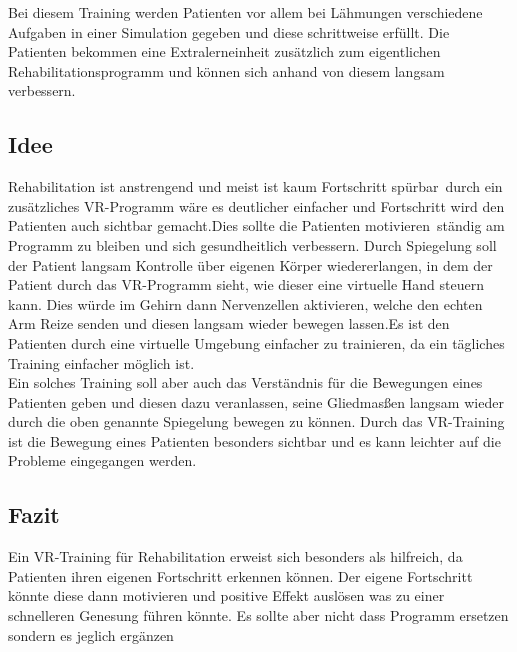 
Bei diesem Training werden Patienten vor allem bei Lähmungen verschiedene Aufgaben in einer Simulation gegeben und diese schrittweise erfüllt. Die Patienten bekommen eine Extralerneinheit zusätzlich zum eigentlichen Rehabilitationsprogramm und können sich anhand von diesem langsam verbessern.\\

\subsection{Idee}
Rehabilitation ist anstrengend und meist ist kaum Fortschritt spürbar durch ein zusätzliches VR-Programm wäre es deutlicher einfacher und Fortschritt wird den Patienten auch sichtbar gemacht.Dies sollte die Patienten motivieren ständig am Programm zu bleiben und sich gesundheitlich verbessern. Durch Spiegelung soll der Patient langsam Kontrolle über eigenen Körper wiedererlangen, in dem der Patient durch das VR-Programm sieht, wie dieser eine virtuelle Hand steuern kann. Dies würde im Gehirn dann Nervenzellen aktivieren, welche den echten Arm Reize senden und diesen langsam wieder bewegen lassen.Es ist den Patienten durch eine virtuelle Umgebung einfacher zu trainieren, da ein tägliches Training einfacher möglich ist. \cite{laver2017virtual} \\
Ein solches Training soll aber auch das Verständnis für die Bewegungen eines Patienten geben und diesen dazu veranlassen, seine Gliedmasßen langsam wieder durch die oben genannte Spiegelung bewegen zu können. Durch das VR-Training ist die Bewegung eines Patienten besonders sichtbar und es kann leichter auf die Probleme eingegangen werden. \cite{sveistrup2004motor} \\

\subsection{Fazit}
Ein VR-Training für Rehabilitation erweist sich besonders als hilfreich, da Patienten ihren eigenen Fortschritt erkennen können. Der eigene Fortschritt könnte diese dann motivieren und positive Effekt auslösen was zu einer schnelleren Genesung führen könnte. Es sollte aber nicht dass Programm ersetzen sondern es jeglich ergänzen


